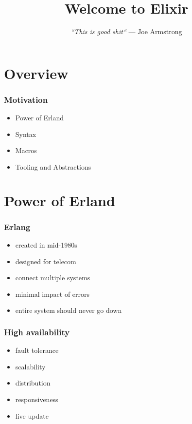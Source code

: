 \documentclass{beamer}
\begin{document}
\title{Welcome to Elixir}
\subtitle{
  \textit{
    \linebreak
    ``This is good shit``
    \linebreak
  }
  \tiny{\textrm{--- Joe Armstrong}}
}
\frame{\titlepage}


\section[Section]{Overview}

\begin{frame}
  \frametitle{Motivation}
  \begin{itemize}
  \item Power of Erland
  \item Syntax
  \item Macros
  \item Tooling and Abstractions
  \end{itemize}
\end{frame}

\section[Section]{Power of Erland}

\begin{frame}
  \frametitle{Erlang}
  \begin{itemize}
  \item created in mid-1980s
  \item designed for telecom
  \item connect multiple systems
  \item minimal impact of errors
  \item entire system should never go down
  \end{itemize}
\end{frame}

\begin{frame}
  \frametitle{High availability}
  \begin{itemize}
  \item fault tolerance
  \item scalability
  \item distribution
  \item responsiveness
  \item live update
  \end{itemize}
\end{frame}
\end{document}
